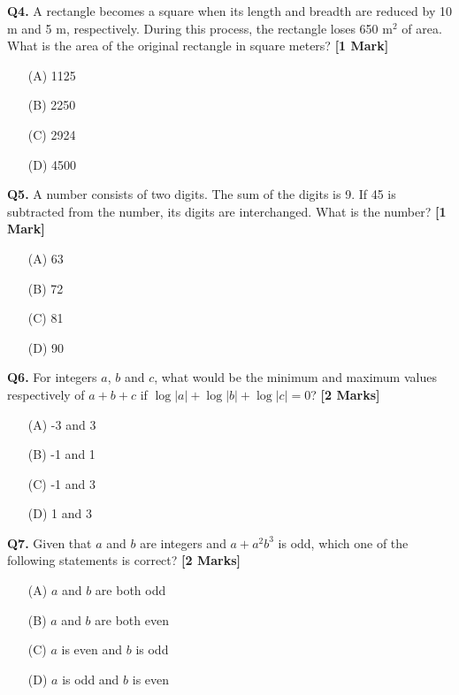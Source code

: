 \documentclass[11pt]{article}
\newcommand{\questiona}[2]{
    \noindent\textbf{Q#2.} #1 \hfill \textbf{[1 Mark]}
}
\newcommand{\questionb}[2]{
    \noindent\textbf{Q#2.} #1 \hfill \textbf{[2 Marks]}
}
\begin{document}
\questiona{A rectangle becomes a square when its length and breadth are reduced by 10 m and 5 m, respectively. During this process, the rectangle loses 650 m\(^2\) of area. What is the area of the original rectangle in square meters?}{4}
\begin{enumerate}
    \item[(A)] 1125
    \item[(B)] 2250
    \item[(C)] 2924
    \item[(D)] 4500
\end{enumerate}
\vspace{0.5cm}

\questiona{A number consists of two digits. The sum of the digits is 9. If 45 is subtracted from the number, its digits are interchanged. What is the number?}{5}
\begin{enumerate}
    \item[(A)] 63
    \item[(B)] 72
    \item[(C)] 81
    \item[(D)] 90
\end{enumerate}
\vspace{0.5cm}

\questionb{For integers \(a\), \(b\) and \(c\), what would be the minimum and maximum values respectively of \(a + b + c\) if \(\log |a| + \log |b| + \log |c| = 0\)?}{6}
\begin{enumerate}
    \item[(A)] -3 and 3
    \item[(B)] -1 and 1
    \item[(C)] -1 and 3
    \item[(D)] 1 and 3
\end{enumerate}
\vspace{0.5cm}

\questionb{Given that \(a\) and \(b\) are integers and \(a + a^2b^3\) is odd, which one of the following statements is correct?}{7}
\begin{enumerate}
    \item[(A)] \(a\) and \(b\) are both odd
    \item[(B)] \(a\) and \(b\) are both even
    \item[(C)] \(a\) is even and \(b\) is odd
    \item[(D)] \(a\) is odd and \(b\) is even
\end{enumerate}
\vspace{0.5cm}
\end{document}
